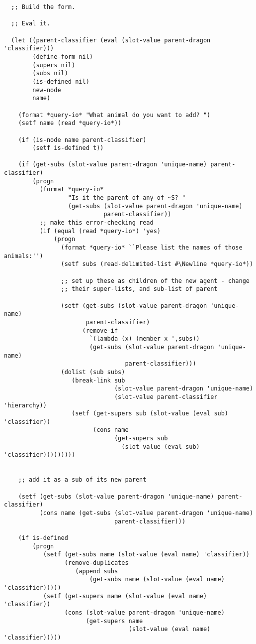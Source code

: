 \begin{verbatim}
  ;; Build the form.

  ;; Eval it.

  (let ((parent-classifier (eval (slot-value parent-dragon 'classifier)))
        (define-form nil)
        (supers nil)
        (subs nil)
        (is-defined nil)
        new-node
        name)

    (format *query-io* "What animal do you want to add? ")
    (setf name (read *query-io*))

    (if (is-node name parent-classifier)
        (setf is-defined t))
	
    (if (get-subs (slot-value parent-dragon 'unique-name) parent-classifier)
        (progn
          (format *query-io*
                  "Is it the parent of any of ~S? " 
                  (get-subs (slot-value parent-dragon 'unique-name) 
                            parent-classifier))
          ;; make this error-checking read
          (if (equal (read *query-io*) 'yes)
              (progn
                (format *query-io* ``Please list the names of those animals:'')
                (setf subs (read-delimited-list #\Newline *query-io*))

                ;; set up these as children of the new agent - change
                ;; their super-lists, and sub-list of parent

                (setf (get-subs (slot-value parent-dragon 'unique-name)
                       parent-classifier)
                      (remove-if
                        `(lambda (x) (member x ',subs))
                        (get-subs (slot-value parent-dragon 'unique-name)
                                  parent-classifier)))
                (dolist (sub subs)
                   (break-link sub
                               (slot-value parent-dragon 'unique-name)
                               (slot-value parent-classifier 'hierarchy))
                   (setf (get-supers sub (slot-value (eval sub) 'classifier))
                         (cons name
                               (get-supers sub
                                 (slot-value (eval sub) 'classifier)))))))))


    ;; add it as a sub of its new parent

    (setf (get-subs (slot-value parent-dragon 'unique-name) parent-classifier)
          (cons name (get-subs (slot-value parent-dragon 'unique-name)
                               parent-classifier)))

    (if is-defined
        (progn
           (setf (get-subs name (slot-value (eval name) 'classifier))
                 (remove-duplicates
                    (append subs
                        (get-subs name (slot-value (eval name) 'classifier)))))
           (setf (get-supers name (slot-value (eval name) 'classifier))
                 (cons (slot-value parent-dragon 'unique-name)
                       (get-supers name
                                   (slot-value (eval name) 'classifier)))))


\end{verbatim}
